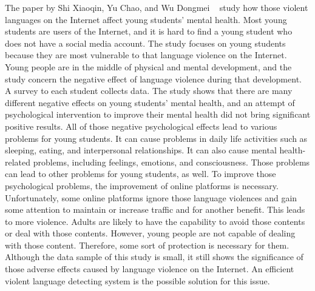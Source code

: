 \documentclass[11pt, natbib=false]{article}
\begin{document}
\begin{multicols}{2}
The paper by Shi Xiaoqin, Yu Chao, and Wu Dongmei ~\cite{shi2021influence} study how those violent languages on the Internet affect young students' mental health.
Most young students are users of the Internet, and it is hard to find a young student who does not have a social media account.
The study focuses on young students because they are most vulnerable to that language violence on the Internet.
Young people are in the middle of physical and mental development, and the study concern the negative effect of language violence during that development.
A survey to each student collects data. The study shows that there are many different negative effects on young students’ mental health, and an attempt of psychological intervention to improve their mental health did not bring significant positive results.
All of those negative psychological effects lead to various problems for young students.
It can cause problems in daily life activities such as sleeping, eating, and interpersonal relationships. It can also cause mental health-related problems, including feelings, emotions, and consciousness.
Those problems can lead to other problems for young students, as well. To improve those psychological problems, the improvement of online platforms is necessary.
Unfortunately, some online platforms ignore those language violences and gain some attention to maintain or increase traffic and for another benefit.
This leads to more violence. Adults are likely to have the capability to avoid those contents or deal with those contents.
However, young people are not capable of dealing with those content. Therefore, some sort of protection is necessary for them.
Although the data sample of this study is small, it still shows the significance of those adverse effects caused by language violence on the Internet.
An efficient violent language detecting system is the possible solution for this issue. 


\end{multicols}
\end{document}
